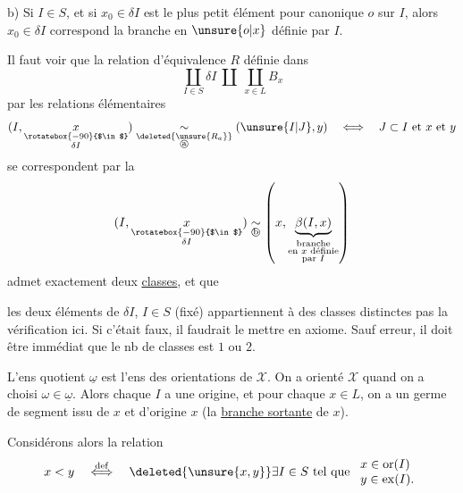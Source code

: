 b) Si $I\in S$, et si $x_0\in\delta I$ est le plus petit élément pour   canonique $o$ sur $I$, alors   $x_0\in\delta I$ correspond la branche en $\unsure{o|x}$ définie par $I$.

Il faut voir que la relation d'équivalence $R$ définie dans
\[
\coprod_{I\in S}\delta I\ \amalg\ \coprod_{x\in L}B_x
\]
par les relations élémentaires  
\[
(I,\underset{\substack{\rotatebox{-90}{$\in$}\\\delta I}}{x})
\underset{\substack{\deleted{\unsure{R_a}}\\\text{\textcircled{a}}}}{\sim}
(\unsure{I|J},y)
\quad\Longleftrightarrow\quad
J\subset I\text{ et }x\text{ et }y
\]
se correspondent par la  
\[
(I,\underset{\substack{\rotatebox{-90}{$\in$}\\\delta I}}{x})
\underset{\text{\textcircled{b}}}{\sim}
\left(x,\underset{\substack{\text{branche}\\\text{en }x\text{ définie}\\\text{par }I}}{\underbrace{\beta(I,x)}}\right)
\]
admet exactement deux \uline{classes}, et que




les deux éléments de $\delta I$, $I\in S$ (fixé) appartiennent à des classes distinctes 
 pas la vérification ici. Si c'était faux, il faudrait le mettre en axiome. Sauf erreur, il doit être immédiat que  le nb de classes est $1$ ou $2$.


L'ens quotient $\underline{\omega}$ est l'ens des orientations de $\mathcal X$.  On a orienté $\mathcal X$ quand on a choisi $\omega\in\underline{\omega}$. Alors chaque $I$ a une origine, et pour chaque $x\in L$, on a un germe de segment  issu de $x$ et d'origine $x$ (la \uline{branche sortante} de $x$).

Considérons alors la relation
\[
x<y\quad\overset{\mathrm{def}}{\Longleftrightarrow}\quad
\deleted{\unsure{x,y}}
\exists I\in S\text{ tel que }
\begin{array}{l}
x\in\operatorname{or}(I)\\
y\in\operatorname{ex}(I).
\end{array}
\]

